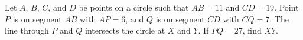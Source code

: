 Let $A$, $B$, $C$, and $D$ be points on a circle such that $AB=11$ and $CD=19$. Point $P$ is on segment $AB$ with $AP=6$, and $Q$ is on segment $CD$ with $CQ=7$. The line through $P$ and $Q$ intersects the circle at $X$ and $Y$. If $PQ=27$, find $XY$.